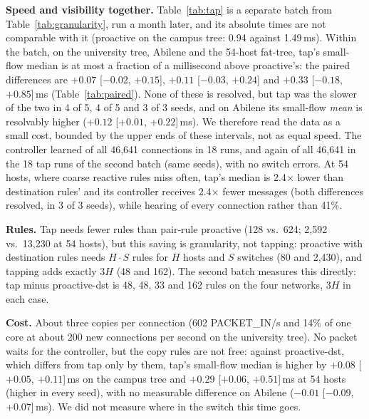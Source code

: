 \documentclass[conference]{IEEEtran}
\begin{document}
\textbf{Speed and visibility together.} Table~\ref{tab:tap} is a separate batch from Table~\ref{tab:granularity}, run a month later, and its absolute times are not comparable with it (proactive on the campus tree: 0.94 against 1.49\,ms). Within the batch, on the university tree, Abilene and the 54-host fat-tree, tap's small-flow median is at most a fraction of a millisecond above proactive's: the paired differences are $+0.07$ [$-0.02$, $+0.15$], $+0.11$ [$-0.03$, $+0.24$] and $+0.33$ [$-0.18$, $+0.85$]\,ms (Table~\ref{tab:paired}). None of these is resolved, but tap was the slower of the two in 4 of 5, 4 of 5 and 3 of 3 seeds, and on Abilene its small-flow \emph{mean} is resolvably higher ($+0.12$ [$+0.01$, $+0.22$]\,ms). We therefore read the data as a small cost, bounded by the upper ends of these intervals, not as equal speed. The controller learned of all 46,641 connections in 18 runs, and again of all 46,641 in the 18 tap runs of the second batch (same seeds), with no switch errors. At 54 hosts, where coarse reactive rules miss often, tap's median is 2.4$\times$ lower than destination rules' and its controller receives 2.4$\times$ fewer messages (both differences resolved, in 3 of 3 seeds), while hearing of every connection rather than 41\%.

\textbf{Rules.} Tap needs fewer rules than pair-rule proactive (128 vs.\ 624; 2,592 vs.\ 13,230 at 54 hosts), but this saving is granularity, not tapping: proactive with destination rules needs $H\cdot S$ rules for $H$ hosts and $S$ switches (80 and 2,430), and tapping adds exactly $3H$ (48 and 162). The second batch measures this directly: tap minus proactive-dst is 48, 48, 33 and 162 rules on the four networks, $3H$ in each case.

\textbf{Cost.} About three copies per connection (602 PACKET\_IN/s and 14\% of one core at about 200 new connections per second on the university tree). No packet waits for the controller, but the copy rules are not free: against proactive-dst, which differs from tap only by them, tap's small-flow median is higher by $+0.08$ [$+0.05$, $+0.11$]\,ms on the campus tree and $+0.29$ [$+0.06$, $+0.51$]\,ms at 54 hosts (higher in every seed), with no measurable difference on Abilene ($-0.01$ [$-0.09$, $+0.07$]\,ms). We did not measure where in the switch this time goes.
\end{document}

